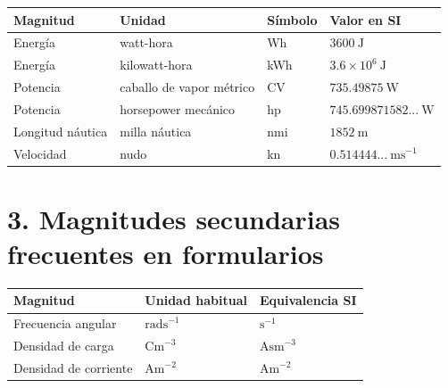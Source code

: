 \documentclass[11pt,a4paper]{article}
\begin{document}
\scriptsize
\begin{tabularx}{\linewidth}{>{\raggedright\arraybackslash}X>{\raggedright\arraybackslash}X>{\raggedright\arraybackslash}X>{\raggedright\arraybackslash}X}
\hline
Magnitud & Unidad & Símbolo & Valor en SI \\
\hline
Energía & watt-hora & Wh & $3600\ \mathrm{J}$ \\
\hline
Energía & kilowatt-hora & kWh & $3.6\times10^6\ \mathrm{J}$ \\
\hline
Potencia & caballo de vapor métrico & CV & $735.49875\ \mathrm{W}$ \\
\hline
Potencia & horsepower mecánico & hp & $745.699871582...\ \mathrm{W}$ \\
\hline
Longitud náutica & milla náutica & nmi & $1852\ \mathrm{m}$ \\
\hline
Velocidad & nudo & kn & $0.514444...\ \mathrm{m s}^{-1}$ \\
\hline
\end{tabularx}
\normalsize

\section*{3. Magnitudes secundarias frecuentes en formularios}

\scriptsize
\begin{tabularx}{\linewidth}{>{\raggedright\arraybackslash}X>{\raggedright\arraybackslash}X>{\raggedright\arraybackslash}X}
\hline
Magnitud & Unidad habitual & Equivalencia SI \\
\hline
Frecuencia angular & $\mathrm{rad s}^{-1}$ & $\mathrm{s}^{-1}$ \\
\hline
Densidad de carga & $\mathrm{C m}^{-3}$ & $\mathrm{A s m}^{-3}$ \\
\hline
Densidad de corriente & $\mathrm{A m}^{-2}$ & $\mathrm{A m}^{-2}$ \\
\hline
\end{tabularx}
\normalsize
\end{document}
